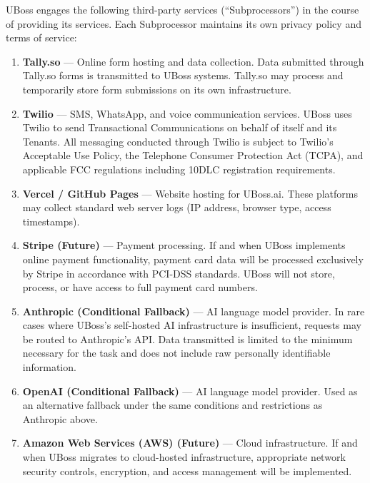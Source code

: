 \documentclass[11pt, letterpaper]{article}
\begin{document}
UBoss engages the following third-party services (``Subprocessors'') in the course of
providing its services. Each Subprocessor maintains its own privacy policy and terms
of service:

\begin{enumerate}
    \item \textbf{Tally.so} --- Online form hosting and data collection. Data submitted
          through Tally.so forms is transmitted to UBoss systems. Tally.so may process
          and temporarily store form submissions on its own infrastructure.

    \item \textbf{Twilio} --- SMS, WhatsApp, and voice communication services. UBoss
          uses Twilio to send Transactional Communications on behalf of itself and its
          Tenants. All messaging conducted through Twilio is subject to Twilio's
          Acceptable Use Policy, the Telephone Consumer Protection Act (TCPA), and
          applicable FCC regulations including 10DLC registration requirements.

    \item \textbf{Vercel / GitHub Pages} --- Website hosting for UBoss.ai. These
          platforms may collect standard web server logs (IP address, browser type,
          access timestamps).

    \item \textbf{Stripe (Future)} --- Payment processing. If and when UBoss implements
          online payment functionality, payment card data will be processed exclusively
          by Stripe in accordance with PCI-DSS standards. UBoss will not store, process,
          or have access to full payment card numbers.

    \item \textbf{Anthropic (Conditional Fallback)} --- AI language model provider. In
          rare cases where UBoss's self-hosted AI infrastructure is insufficient, requests
          may be routed to Anthropic's API. Data transmitted is limited to the minimum
          necessary for the task and does not include raw personally identifiable
          information.

    \item \textbf{OpenAI (Conditional Fallback)} --- AI language model provider. Used as
          an alternative fallback under the same conditions and restrictions as Anthropic
          above.

    \item \textbf{Amazon Web Services (AWS) (Future)} --- Cloud infrastructure. If and
          when UBoss migrates to cloud-hosted infrastructure, appropriate network security
          controls, encryption, and access management will be implemented.
\end{enumerate}
\end{document}
